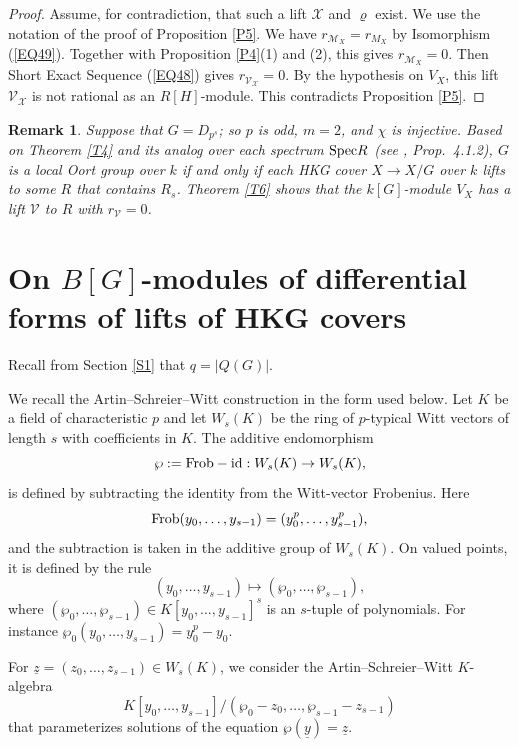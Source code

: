 \documentclass[11pt]{amsart}
\newtheorem{remark}[theorem]{Remark}
\def\Frob{\textup{Frob}}
\def\Spec{\textup{Spec}}
\begin{document}
\begin{proof}
Assume, for contradiction, that such a lift $\mathcal X$ and $\varrho$ exist. We use the notation of the proof of Proposition \ref{P5}. We have $r_{\mathcal M_X}=r_{M_X}$ by Isomorphism (\ref{EQ49}). Together with Proposition \ref{P4}(1) and (2), this gives $r_{\mathcal M_X}=0$. Then Short Exact Sequence (\ref{EQ48}) gives $r_{\mathcal V_{\mathcal X}}=0$. By the hypothesis on $V_X$, this lift $\mathcal V_{\mathcal X}$ is not rational as an $R[H]$-module. This contradicts Proposition \ref{P5}.\end{proof}

\begin{remark}\normalfont\label{R5}
Suppose that $G=D_{p^s}$; so $p$ is odd, $m=2$, and $\chi$ is injective. Based on Theorem \ref{T4} and its analog over each spectrum $\Spec R$ (see \cite{K}, Prop.\ 4.1.2), $G$ is a local Oort group over $k$ if and only if each HKG cover $X\rightarrow X/G$ over $k$ lifts to some $R$ that contains $R_s$. Theorem \ref{T6} shows that the $k[G]$-module $V_X$ has a lift $\mathcal V$ to $R$ with $r_{\mathcal V}=0$.
\end{remark}

\section{On $B[G]$-modules of differential forms of lifts of HKG covers}\label{S13}

Recall from Section \ref{S1} that $q=|Q(G)|$.

We recall the Artin--Schreier--Witt construction in the form used below. Let
$K$ be a field of characteristic $p$ and let $W_s(K)$ be the ring of $p$-typical
Witt vectors of length $s$ with coefficients in $K$. The additive endomorphism
$$\wp:=\Frob-\mathrm{id}:W_s(K)\rightarrow W_s(K),$$
is defined by subtracting the identity from the Witt-vector Frobenius. Here
$$\Frob(y_0,\ldots,y_{s-1})=(y_0^p,\ldots,y_{s-1}^p),$$
and the subtraction is taken in the additive group of $W_s(K)$. On valued
points, it is defined by the rule
$$(y_0,\ldots,y_{s-1})\mapsto(\wp_0,\ldots,\wp_{s-1}),$$
where $(\wp_0,\ldots,\wp_{s-1})\in K[y_0,\ldots,y_{s-1}]^s$ is an $s$-tuple of
polynomials. For instance $\wp_0(y_0,\ldots,y_{s-1})=y_0^p-y_0$.

For $\underline{z}=(z_0,\ldots,z_{s-1})\in W_s(K)$, we consider the Artin--Schreier--Witt $K$-algebra 
$$K[y_0,\ldots,y_{s-1}]/(\wp_0-z_0,\ldots,\wp_{s-1}-z_{s-1})$$ that parameterizes solutions of the equation $\wp(\underline{y})=\underline{z}$.
\end{document}
